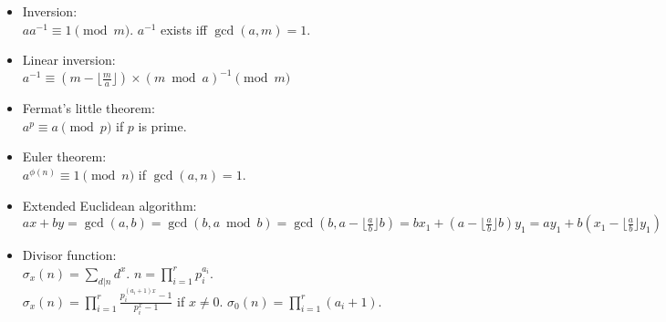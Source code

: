 \documentclass[twocolumn]{article}
\begin{document}
\begin{itemize}
    \item Inversion:\\ $aa^{-1} \equiv 1 \pmod{m}$. $a^{-1}$ exists iff $\gcd(a,m)=1$.
    \item Linear inversion:\\ $a^{-1} \equiv (m - \lfloor\frac{m}{a}\rfloor) \times (m \bmod a)^{-1} \pmod{m}$
    \item Fermat's little theorem:\\ $a^p \equiv a \pmod{p}$ if $p$ is prime.
    \item Euler theorem:\\ $a^{\phi(n)} \equiv 1 \pmod{n}$ if $\gcd(a,n) = 1$.
    \item Extended Euclidean algorithm:\\
    $ax+by=\gcd(a,b)=\gcd(b, a \bmod b)=\gcd(b, a-\lfloor\frac{a}{b}\rfloor b)=bx_1+(a-\lfloor\frac{a}{b}\rfloor b)y_1=ay_1+b(x_1-\lfloor\frac{a}{b}\rfloor y_1)$
    \item Divisor function:\\ $\sigma_x(n) = \sum_{d|n}d^x$. $n=\prod_{i=1}^r p_i^{a_i}$.\\ $\sigma_x(n)=\prod_{i=1}^r \frac{p_i^{(a_i+1)x}-1}{p_i^x-1}$ if $x \neq 0$. $\sigma_0(n)=\prod_{i=1}^r (a_i+1)$.
\end{itemize}
\end{document}
